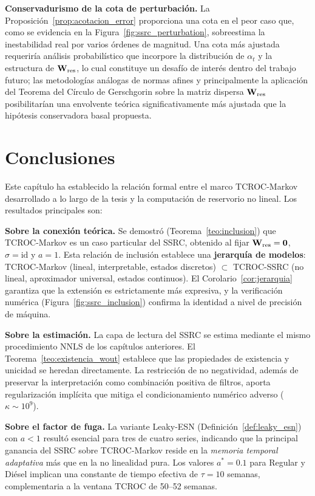 \textbf{Conservadurismo de la cota de perturbación.}  La
Proposición~\ref{prop:acotacion_error} proporciona una cota en el
peor caso que, como se evidencia en la
Figura~\ref{fig:ssrc_perturbation}, sobreestima la inestabilidad
real por varios órdenes de magnitud.  Una cota más ajustada
requeriría análisis probabilístico que incorpore la distribución de
$\alpha_t$ y la estructura de $\mathbf{W}_{\text{res}}$, lo cual
constituye un desafío de interés dentro del trabajo futuro; las metodologías análogas de normas afines y principalmente la aplicación del Teorema del Círculo de Gerschgorin sobre la matriz dispersa $\mathbf{W}_{\text{res}}$ posibilitarían una envolvente teórica significativamente más ajustada que la hipótesis conservadora basal propuesta.

\section{Conclusiones}
\label{sec:ssrc_conclusiones}

Este capítulo ha establecido la relación formal entre el marco
TCROC-Markov desarrollado a lo largo de la tesis y la computación
de reservorio no lineal.  Los resultados principales son:

\textbf{Sobre la conexión teórica.}  Se demostró
(Teorema~\ref{teo:inclusion}) que TCROC-Markov es un caso particular
del SSRC, obtenido al fijar $\mathbf{W}_{\text{res}} = \mathbf{0}$,
$\sigma = \mathrm{id}$ y $a = 1$.  Esta relación de inclusión
establece una \textbf{jerarquía de modelos}: TCROC-Markov (lineal,
interpretable, estados discretos) $\subset$ TCROC-SSRC (no lineal,
aproximador universal, estados continuos).  El
Corolario~\ref{cor:jerarquia} garantiza que la extensión es
estrictamente más expresiva, y la verificación numérica
(Figura~\ref{fig:ssrc_inclusion}) confirma la identidad a nivel de
precisión de máquina.

\textbf{Sobre la estimación.}  La capa de lectura del SSRC se estima
mediante el mismo procedimiento NNLS de los capítulos anteriores.
El Teorema~\ref{teo:existencia_wout} establece que las propiedades
de existencia y unicidad se heredan directamente.  La restricción
de no negatividad, además de preservar la interpretación como
combinación positiva de filtros, aporta regularización implícita que
mitiga el condicionamiento numérico adverso ($\kappa \sim 10^{9}$).

\textbf{Sobre el factor de fuga.}  La variante Leaky-ESN
(Definición~\ref{def:leaky_esn}) con $a < 1$ resultó esencial para
tres de cuatro series, indicando que la principal ganancia del SSRC
sobre TCROC-Markov reside en la \emph{memoria temporal adaptativa}
más que en la no linealidad pura.  Los valores $a^* = 0.1$ para
Regular y Diésel implican una constante de tiempo efectiva de
$\tau = 10$ semanas, complementaria a la ventana TCROC de 50--52
semanas.

